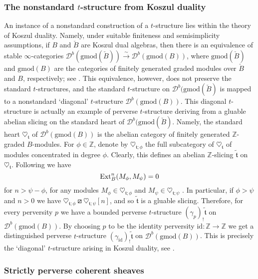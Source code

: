 \documentclass{article}
\theoremstyle{definition}
\newcommand{\Z}{\mathbb{Z}}
\newcommand{\tee}{\mathfrak{t}}
\newcommand{\orth}{\boxslash}
\begin{document}
\subsubsection{The nonstandard $t$-structure from Koszul duality}


 An instance of a nonstandard construction of a $t$-structure lies within the theory of Koszul duality. Namely, under suitable finiteness and semisimplicity assumptions, if $B$ and $\check{B}$ are Koszul dual algebras, then there is an equivalence of stable $\infty$-categories $\mathscr{D}^b(\mathrm{gmod}(\check{B}))\xrightarrow{\sim}\mathscr{D}^b(\mathrm{gmod}({B}))$, where $\mathrm{gmod}(\check{B})$ and $\mathrm{gmod}({B})$ are the categories of finitely generated graded modules over $\check{B}$ and $B$, respectively; see \cite{kosz}. This equivalence, however, does not preserve the standard $t$-structures, and the standard $t$-structure on $\mathscr{D}^b(\mathrm{gmod}(\check{B})$ is mapped to a nonstandard `diagonal' $t$-structure $\mathscr{D}^b(\mathrm{gmod}({B}))$. This diagonal $t$-structure is actually an example of perverse $t$-structure deriving from a gluable abelian slicing on the standard heart of $\mathscr{D}^b(\mathrm{gmod}(\check{B})$. Namely, the standard heart $\heartsuit_\tee$ of $\mathscr{D}^b(\mathrm{gmod}({B}))$ is the abelian category of finitely generated $\Z$-graded $B$-modules. For $\phi \in \Z$, denote by $\heartsuit_{\tee;\phi}$ the full subcategory of $\heartsuit_{\tee}$ of modules concentrated in degree $\phi$. Clearly, this defines an abelian $\Z$-slicing $\tilde{\tee}$ on $\heartsuit_{\tee}$. Following \cite{kosz} we have
  \[
  \textnormal{Ext}_{B}^n(M_{\phi},M_{\psi})=0
  \]
for $n>\psi - \phi$, for any modules $M_\phi\in\heartsuit_{\tee;\phi}$ and $M_\psi\in\heartsuit_{\tee;\psi}$ . In particular, if $\phi>\psi$ and $n>0$ we have  $\heartsuit_{\tee;\phi}\orth \heartsuit_{\tee;\psi}[n]$, and so
$\tilde{\tee}$ is a gluable slicing. Therefore, for every perversity $p$  we have a bounded perverse $t$-structure $(\gamma_p)_!\tilde{\tee}$ on $\mathscr{D}^b(\mathrm{gmod}({B}))$. By choosing $p$ to be the identity perversity $\mathrm{id}\colon \Z\to \Z$ we get a distinguished perverse $t$-structure $(\gamma_{\mathrm{id}})_!\tilde{\tee}$ on $\mathscr{D}^b(\mathrm{gmod}({B}))$. This is precisely the `diagonal' $t$-structure arising in Koszul duality, see \cite{kosz}. 


\subsubsection{Strictly perverse coherent sheaves}\label{perverse-coherent}
\end{document}
